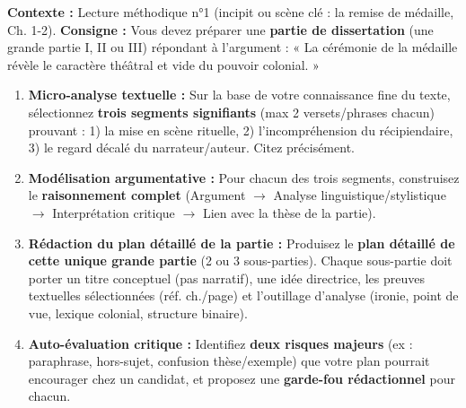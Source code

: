 \documentclass[11pt]{article}
\begin{document}
\begin{exercice}
\textbf{Contexte :} Lecture méthodique n°1 (incipit ou scène clé : la remise de médaille, Ch. 1-2). 
\textbf{Consigne :} Vous devez préparer une \textbf{partie de dissertation} (une grande partie I, II ou III) répondant à l'argument : « La cérémonie de la médaille révèle le caractère théâtral et vide du pouvoir colonial. »

\begin{enumerate}
    \item \textbf{Micro-analyse textuelle :} Sur la base de votre connaissance fine du texte, sélectionnez \textbf{trois segments signifiants} (max 2 versets/phrases chacun) prouvant : 1) la mise en scène rituelle, 2) l'incompréhension du récipiendaire, 3) le regard décalé du narrateur/auteur. Citez précisément.
    \item \textbf{Modélisation argumentative :} Pour chacun des trois segments, construisez le \textbf{raisonnement complet} (Argument $\rightarrow$ Analyse linguistique/stylistique $\rightarrow$ Interprétation critique $\rightarrow$ Lien avec la thèse de la partie).
    \item \textbf{Rédaction du plan détaillé de la partie :} Produisez le \textbf{plan détaillé de cette unique grande partie} (2 ou 3 sous-parties). Chaque sous-partie doit porter un titre conceptuel (pas narratif), une idée directrice, les preuves textuelles sélectionnées (réf. ch./page) et l'outillage d'analyse (ironie, point de vue, lexique colonial, structure binaire).
    \item \textbf{Auto-évaluation critique :} Identifiez \textbf{deux risques majeurs} (ex : paraphrase, hors-sujet, confusion thèse/exemple) que votre plan pourrait encourager chez un candidat, et proposez une \textbf{garde-fou rédactionnel} pour chacun.
\end{enumerate}
\end{exercice}
\end{document}
